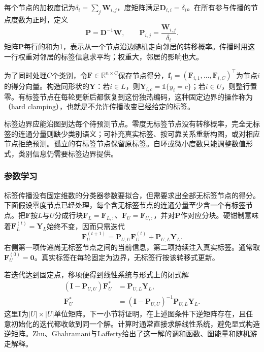 每个节点的加权度记为$\delta_i=\sum_j\bm{W}_{i,j}$，度矩阵满足$\bm{D}_{i,i}=\delta_i$。在所有参与传播的节点度数为正时，定义
\begin{equation}
  \label{eq:classification-label-propagation-transition}
  \bm{P}=\bm{D}^{-1}\bm{W},
  \qquad
  \bm{P}_{i,j}=\frac{\bm{W}_{i,j}}{\delta_i}.
\end{equation}
矩阵$\bm{P}$每行的和为1，表示从一个节点沿边随机走向邻居的转移概率。传播时用这一行权重对邻居的标签信息求平均；权重大，邻居的影响也大。

为了同时处理$C$个类别，令$\bm{F}\in\mathbb{R}^{n\times C}$保存节点得分，$\bm{f}_i=(\bm{F}_{i,1},\dots,\bm{F}_{i,C})^\top$为节点$i$的得分向量。构造同形状的$\bm{Y}$：若$i\in L$，则$\bm{Y}_{i,c}=\mathbb{1}\{y_i=c\}$；若$i\in U$，则整行置零。有标签节点在每轮更新后都恢复到这份独热编码，这种固定边界的操作称为（hard clamping），也就是不允许传播改变已经给定的标签。

标签边界应能沿图到达每个待预测节点。零度无标签节点没有转移概率，完全无标签的连通分量则缺少类别语义；可补充真实标签、按可靠关系重新构图，或对相应节点拒绝预测。孤立的有标签节点保留原标签。自环或微小度数只能调整数值形式，类别信息仍需要标签边界提供。

\subsubsection{参数学习}
\label{sec:classification-label-propagation-learning}

标签传播没有固定维数的分类器参数要拟合，但需要求出全部无标签节点的得分。下面假设零度节点已经处理，每个含无标签节点的连通分量至少含一个有标签节点。把$\bm{F}$按$L$与$U$分成行块$\bm{F}_L=\bm{F}_{L,:}$、$\bm{F}_U=\bm{F}_{U,:}$，并对$\bm{P}$作对应分块。硬钳制意味着$\bm{F}_L^{(t)}=\bm{Y}_L$始终不变，因而只需迭代
\begin{equation}
  \label{eq:classification-label-propagation-iteration}
  \bm{F}_U^{(t+1)}
    =\bm{P}_{U,U}\bm{F}_U^{(t)}
     +\bm{P}_{U,L}\bm{Y}_L.
\end{equation}
右侧第一项传递尚无标签节点之间的当前信息，第二项持续注入真实标签。通常取$\bm{F}_U^{(0)}=\bm{0}$。真实标签在每轮固定为边界，无标签行按该转移式更新。

若迭代达到固定点，移项便得到线性系统与形式上的闭式解
\begin{equation}
  \label{eq:classification-label-propagation-solution}
  \begin{aligned}
    (\bm{I}-\bm{P}_{U,U})\bm{F}_U^\ast
      &=\bm{P}_{U,L}\bm{Y}_L,\\
    \bm{F}_U^\ast
      &=(\bm{I}-\bm{P}_{U,U})^{-1}
        \bm{P}_{U,L}\bm{Y}_L.
  \end{aligned}
\end{equation}
这里$\bm{I}$为$|U|\times|U|$单位矩阵。下一小节将证明，在上述图条件下逆矩阵存在，且任意初始化的迭代都收敛到同一个解。计算时通常直接求解线性系统，避免显式构造逆矩阵。Zhu、Ghahramani与Lafferty给出了这一解的调和函数、图能量和随机游走解释。

